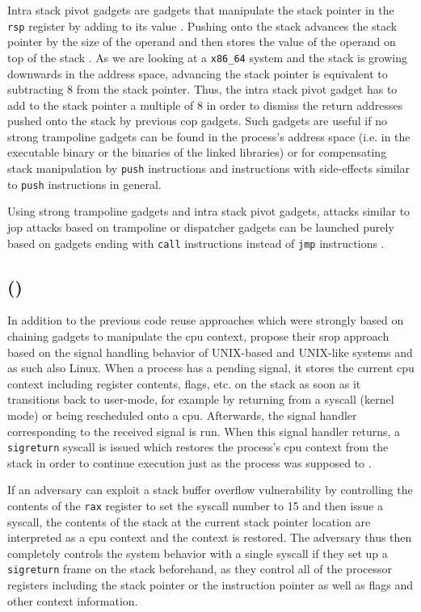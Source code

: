 Intra stack pivot gadgets are gadgets that manipulate the stack pointer in the \texttt{rsp} register by adding to its value \cite{Sadeghi2018}.
Pushing onto the stack advances the stack pointer by the size of the operand and then stores the value of the operand on top of the stack \cite[4-513\psq]{IntelCorporation2020}.
As we are looking at a \texttt{x86\_64} system and the stack is growing downwards in the address space, advancing the stack pointer is equivalent to subtracting 8 from the stack pointer.
Thus, the intra stack pivot gadget has to add to the stack pointer a multiple of 8 in order to dismiss the return addresses pushed onto the stack by previous \gls{cop} gadgets.
Such gadgets are useful if no strong trampoline gadgets can be found in the process's address space (i.e. in the executable binary or the binaries of the linked libraries) or for compensating stack manipulation by \texttt{push} instructions and instructions with side-effects similar to \texttt{push} instructions in general.

Using strong trampoline gadgets and intra stack pivot gadgets, attacks similar to \gls{jop} attacks based on trampoline or dispatcher gadgets can be launched purely based on gadgets ending with \texttt{call} instructions instead of \texttt{jmp} instructions \cite{Sadeghi2018}.

\subsection{ ()}
\label{subsec:cr-srop}

In addition to the previous code reuse approaches which were strongly based on chaining gadgets to manipulate the \acs{cpu} context, \citeauthor{Bosman2014} propose their \gls{srop} approach based on the signal handling behavior of UNIX-based and UNIX-like systems and as such also Linux.
When a process has a pending signal, it stores the current \acs{cpu} context including register contents, flags, etc. on the stack as soon as it transitions back to user-mode, for example by returning from a \gls{syscall} (kernel mode) or being rescheduled onto a \acs{cpu}.
Afterwards, the signal handler corresponding to the received signal is run.
When this signal handler returns, a \texttt{sigreturn} \gls{syscall} is issued which restores the process's \acs{cpu} context from the stack in order to continue execution just as the process was supposed to \cite{Bosman2014,Kerrisk2020a}.

If an adversary can exploit a stack buffer overflow vulnerability by controlling the contents of the \texttt{rax} register to set the \gls{syscall} number to 15 \cite[\texttt{arch/x86/entry/\linebreak[0]syscalls/syscall\_64.tbl}]{LKD2020} and then issue a \gls{syscall}, the contents of the stack at the current stack pointer location are interpreted as a \acs{cpu} context and the context is restored.
The adversary thus then completely controls the system behavior with a single \gls{syscall} if they set up a \texttt{sigreturn} frame on the stack beforehand, as they control all of the processor registers including the stack pointer or the instruction pointer as well as flags and other context information.

